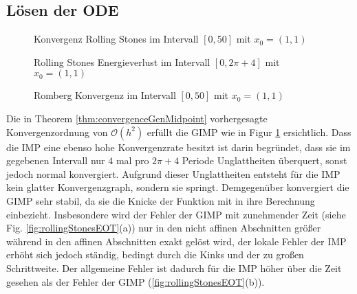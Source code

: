 \subsection{Lösen der ODE}
\begin{figure}
\centering

\caption{Konvergenz Rolling Stones im Intervall $[0,50]$ mit $x_0=(1,1)$}
\label{fig:rollingStonesConvergence}
\end{figure}


\begin{figure}[H]
\footnotesize 
\centering
\begin{minipage}[b]{0.45\linewidth}

\caption{Rolling Stones Energieverlust im Intervall $[0,2\pi+4]$ mit $x_0=(1,1)$}
\label{fig:rollingStonesEnergyError}
\end{minipage}
\quad
\begin{minipage}[b]{0.45\linewidth}

\caption{Romberg Konvergenz im Intervall $[0,50]$ mit $x_0=(1,1)$}
\label{fig:rollingStonesConvergenceRomberg}
\end{minipage}

\end{figure}


Die in Theorem \ref{thm:convergenceGenMidpoint} vorhergesagte Konvergenzordnung von $\mathcal O(h^2)$ erfüllt die GIMP wie in Figur \ref{fig:rollingStonesConvergence} ersichtlich.
Dass die IMP eine ebenso hohe Konvergenzrate besitzt ist darin begründet, dass sie im gegebenen Intervall nur $4$ mal pro $2\pi+4$ Periode Unglattheiten überquert, sonst jedoch normal konvergiert. Aufgrund dieser Unglattheiten entsteht für die IMP kein glatter Konvergenzgraph, sondern sie springt. Demgegenüber konvergiert die GIMP sehr stabil, da sie die Knicke der Funktion mit in ihre Berechnung einbezieht.
Insbesondere wird der Fehler der GIMP mit zunehmender Zeit (siehe Fig. \ref{fig:rollingStonesEOT}(a)) nur in den nicht affinen Abschnitten größer während in den affinen Abschnitten exakt gelöst wird, der lokale Fehler der IMP erhöht sich jedoch ständig, bedingt durch die Kinks und der zu großen Schrittweite. Der allgemeine Fehler ist dadurch für die IMP höher über die Zeit gesehen als der Fehler der GIMP (\ref{fig:rollingStonesEOT}(b)).


